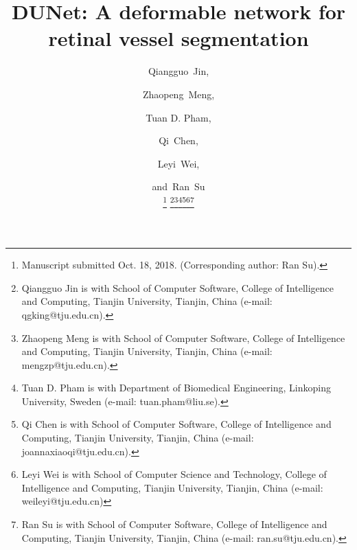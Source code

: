 \documentclass[journal]{IEEEtran}
\begin{document}
\title{DUNet: A deformable network for retinal vessel segmentation}


\author{Qiangguo~Jin,
\and
Zhaopeng~Meng,
\and 
Tuan D. Pham,
\and
Qi~Chen,
\and
Leyi~Wei,
\and
and~Ran~Su


\thanks{Manuscript submitted Oct. 18, 2018. (Corresponding author: Ran Su).}
\thanks{Qiangguo Jin is with School of Computer Software, College of Intelligence and Computing, Tianjin University, Tianjin, China (e-mail: qgking@tju.edu.cn).}\thanks{Zhaopeng Meng is with School of Computer Software, College of Intelligence and Computing, Tianjin University, Tianjin, China (e-mail: mengzp@tju.edu.cn).}\thanks{Tuan D. Pham is with Department of Biomedical Engineering, Linkoping University, Sweden (e-mail: tuan.pham@liu.se). }\thanks{Qi Chen is with School of Computer Software, College of Intelligence and Computing, Tianjin University, Tianjin, China (e-mail: joannaxiaoqi@tju.edu.cn). }\thanks{Leyi Wei is with School of Computer Science and Technology, College of Intelligence and Computing, Tianjin University, Tianjin, China (e-mail: weileyi@tju.edu.cn)}\thanks{Ran Su is with School of Computer Software, College of Intelligence and Computing, Tianjin University, Tianjin, China (e-mail: ran.su@tju.edu.cn).}
}

















\maketitle
\end{document}
